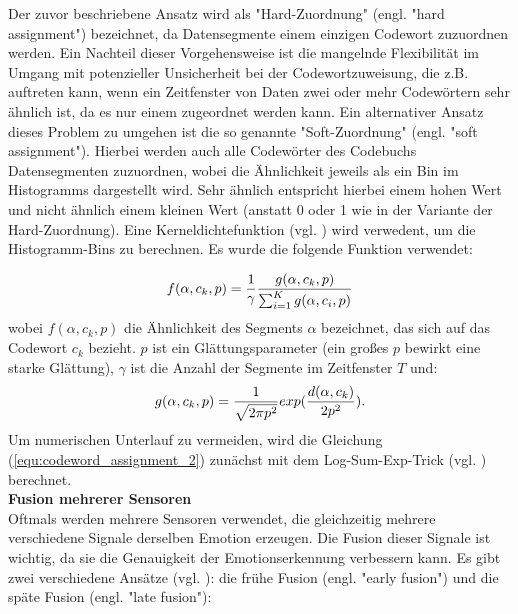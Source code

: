 Der zuvor beschriebene Ansatz wird als "Hard-Zuordnung" (engl. "hard assignment") bezeichnet, da Datensegmente einem einzigen Codewort zuzuordnen werden.
Ein Nachteil dieser Vorgehensweise ist die mangelnde Flexibilität im Umgang mit potenzieller Unsicherheit bei der Codewortzuweisung, die z.B. auftreten kann, wenn ein Zeitfenster von Daten zwei oder mehr Codewörtern sehr ähnlich ist, da es nur einem zugeordnet werden kann. 
Ein alternativer Ansatz dieses Problem zu umgehen ist die so genannte "Soft-Zuordnung" (engl. "soft assignment"). Hierbei werden auch alle Codewörter des Codebuchs Datensegmenten zuzuordnen, wobei die Ähnlichkeit jeweils als ein Bin im Histogramms dargestellt wird. Sehr ähnlich entspricht hierbei einem hohen Wert und nicht ähnlich einem kleinen Wert (anstatt 0 oder 1 wie in der Variante der Hard-Zuordnung). 
Eine Kerneldichtefunktion (vgl. \cite{gemert_ieee_2009}) wird verwedent, um die Histogramm-Bins zu berechnen. Es wurde die folgende Funktion verwendet:


\begin{equation} 
\Large{ {f(\alpha,c_k,p) = \frac{1}{\gamma}} \frac{g(\alpha,c_k,p)}{\sum_{i=1}^{K} g(\alpha,c_i,p)}}
\end{equation}
\newline
wobei $f(\alpha,c_k,p)$ die Ähnlichkeit des Segments $\alpha$ bezeichnet, das sich auf das Codewort $c_k$ bezieht. $p$ ist ein Glättungsparameter (ein großes $p$ bewirkt eine starke Glättung), $\gamma$ ist die Anzahl der Segmente im Zeitfenster $T$ und: \\
\begin{equation} 
\Large{ { g(\alpha,c_k,p) = \frac{1}{\sqrt{2 \pi p^{ 2 }}}} exp(\frac{d(\alpha,c_k)}{2p^{2}}). }
\label{equ:codeword_assignment_2} \end{equation}
\newline
Um numerischen Unterlauf zu vermeiden, wird die Gleichung (\ref{equ:codeword_assignment_2}) zunächst mit dem Log-Sum-Exp-Trick (vgl. \cite{murphy_2012}) berechnet. \\


\textbf{Fusion mehrerer Sensoren \\}
Oftmals werden mehrere Sensoren verwendet, die gleichzeitig mehrere verschiedene Signale derselben Emotion erzeugen.
Die Fusion dieser Signale ist wichtig, da sie die Genauigkeit der Emotionserkennung verbessern kann.
Es gibt zwei verschiedene Ansätze (vgl. \cite{snoek_2005}): die frühe Fusion (engl. "early fusion") und die späte Fusion (engl. "late fusion"): 

